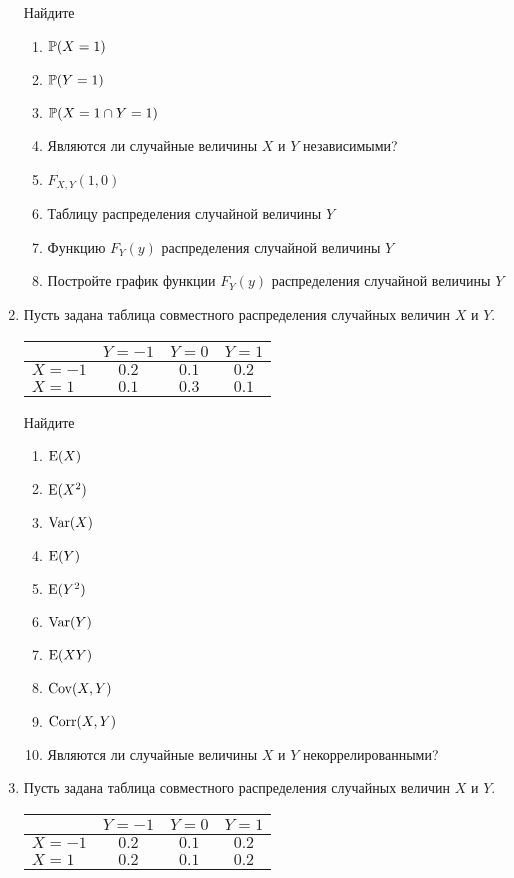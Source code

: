 \begin{enumerate}
Найдите
\begin{enumerate}
\item $\P(X = 1)$
\item $\P(Y = 1)$
\item $\P(X = 1 \cap Y = 1)$
\item Являются ли случайные величины $X$ и $Y$ независимыми?
\item $F_{X,Y}(1,0)$
\item Таблицу распределения случайной величины $Y$
\item Функцию $F_{Y}(y)$ распределения случайной величины $Y$
\item Постройте график функции $F_{Y}(y)$ распределения случайной величины $Y$
\end{enumerate}

\item Пусть задана таблица совместного распределения случайных величин $X$ и $Y$.

\begin{center}
\begin{tabular}{lccc}
\toprule
                       & $Y=-1$  & $Y=0$   & $Y=1$   \\ \midrule
$X=-1$                 & $0.2$ & $0.1$ & $0.2$ \\
 $X=1$                 & $0.1$ & $0.3$ & $0.1$ \\ \bottomrule
\end{tabular}
\end{center}

Найдите
\begin{enumerate}
\item $\E(X)$
\item $\E(X^{2})$
\item $\Var(X)$
\item $\E(Y)$
\item $\E(Y^{2})$
\item $\Var(Y)$
\item $\E(XY)$
\item $\Cov(X,Y)$
\item $\Corr(X,Y)$
\item Являются ли случайные величины $X$ и $Y$ некоррелированными?
\end{enumerate}

\item Пусть задана таблица совместного распределения случайных величин $X$ и $Y$.

\begin{center}
\begin{tabular}{lccc}
\toprule
                       & $Y=-1$  & $Y=0$  & $Y=1$  \\ \midrule
$X=-1$                 & $0.2$ & $0.1$ & $0.2$ \\
 $X=1$                 & $0.2$ & $0.1$ & $0.2$ \\ \bottomrule
\end{tabular}
\end{center}


\end{enumerate}
